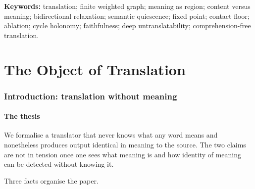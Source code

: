 \documentclass[11pt,a4paper]{article}
\theoremstyle{thmstyle}
\theoremstyle{definition}
\theoremstyle{remark}
\begin{document}
\begin{abstract}
meaning (translates it by routing around the broken form), the
content-substituter depends on form (mangles it), and our method depends on
neither but on the existence of a fixed point (translates it iff the
relaxation still reaches quiescence, and declines otherwise where the human
infers and the substituter hallucinates). The elements that the relaxation
holds fixed are found by \emph{ablation}, of emergent grain; faithfulness is
zero back-holonomy; the perturbation suite measures the framework's own
floor, opacity, mobility, and holonomy. This is translation without meaning:
meaning-identical output by a meaning-blind, comprehension-free mechanism,
sufficient exactly where a fixed point exists. Every claim is a construction
on finite weighted graphs; interpretation is confined to remarks.
\end{abstract}

\noindent\textbf{Keywords:} translation; finite weighted graph; meaning as
region; content versus meaning; bidirectional relaxation; semantic
quiescence; fixed point; contact floor; ablation; cycle holonomy;
faithfulness; deep untranslatability; comprehension-free translation.

\tableofcontents

\part{The Object of Translation}

\section{Introduction: translation without meaning}
\label{sec:intro}

\subsection{The thesis}

We formalise a translator that never knows what any word means and
nonetheless produces output identical in meaning to the source. The two
claims are not in tension once one sees what meaning is and how identity of
meaning can be detected without knowing it.

Three facts organise the paper.
\end{document}
